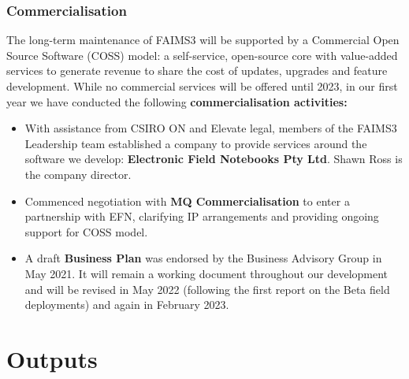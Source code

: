 \documentclass[
	aspectratio=169, %
	11pt, %
	t, %
]{beamer}
\begin{document}
\begin{frame}%
	\frametitle{Commercialisation}
   The long-term maintenance of FAIMS3 will be supported by a Commercial Open Source Software (COSS) model: a self-service, open-source core with value-added services to generate revenue to share the cost of updates, upgrades and feature development. While no commercial services will be offered until 2023, in our first year we have conducted the following     \textbf{commercialisation activities:}
    
    \begin{itemize}
        \item With assistance from CSIRO ON and Elevate legal, members of the FAIMS3 Leadership team established a company to provide services around the software we develop: \textbf{Electronic Field Notebooks Pty Ltd}. Shawn Ross is the company director. 
        \item Commenced negotiation with \textbf{MQ Commercialisation} to enter a partnership with EFN, clarifying IP arrangements and providing ongoing support for COSS model.
        \item A draft \textbf{Business Plan} was endorsed by the Business Advisory Group in May 2021. It will remain a working document throughout our development and will be revised in May 2022 (following the first report on the Beta field deployments) and again in February 2023. 
        

    \end{itemize}
    
  

\end{frame}

\section{Outputs}
\end{document}
